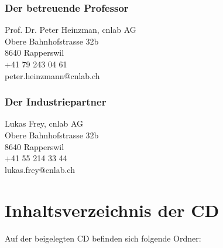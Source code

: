 \subsubsection{Der betreuende Professor}
Prof. Dr. Peter Heinzman, cnlab AG\\
Obere Bahnhofstrasse 32b\\
8640 Rapperswil\\
+41 79 243 04 61\\
peter.heinzmann@cnlab.ch

\subsubsection{Der Industriepartner}
Lukas Frey, cnlab AG\\
Obere Bahnhofstrasse 32b\\
8640 Rapperswil\\
+41 55 214 33 44\\
lukas.frey@cnlab.ch

\section{Inhaltsverzeichnis der CD}
Auf der beigelegten CD befinden sich folgende Ordner:
%


